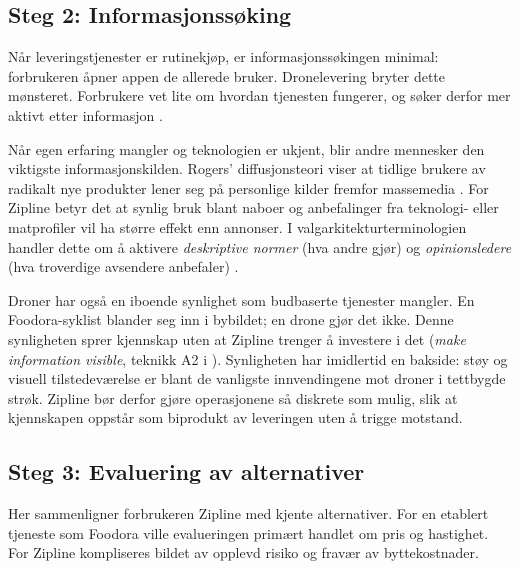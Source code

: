 \documentclass[12pt, a4paper]{article}
\begin{document}
\subsection{Steg 2: Informasjonssøking}

Når leveringstjenester er rutinekjøp, er informasjonssøkingen minimal:
forbrukeren åpner appen de allerede bruker. Dronelevering bryter dette
mønsteret. Forbrukere vet lite om hvordan tjenesten fungerer, og søker
derfor mer aktivt etter informasjon
\parencite[jf.][om søkeinnsats og forhåndskunnskap]{kotlerkeller2016}.

Når egen erfaring mangler og teknologien er ukjent, blir andre mennesker
den viktigste informasjonskilden. Rogers' diffusjonsteori viser at tidlige
brukere av radikalt nye produkter lener seg på personlige kilder fremfor
massemedia \parencite{rogers2003}. For Zipline betyr det at synlig bruk
blant naboer og anbefalinger fra teknologi- eller matprofiler vil ha
større effekt enn annonser. I valgarkitekturterminologien handler dette om
å aktivere \textit{deskriptive normer} (hva andre gjør) og
\textit{opinionsledere} (hva troverdige avsendere anbefaler)
\parencite[jf.][]{muenscher2016}.

Droner har også en iboende synlighet som budbaserte tjenester mangler. En
Foodora-syklist blander seg inn i bybildet; en drone gjør det ikke. Denne
synligheten sprer kjennskap uten at Zipline trenger å investere i det
(\textit{make information visible}, teknikk A2 i \cite{muenscher2016}).
Synligheten har imidlertid en bakside: støy og visuell tilstedeværelse er
blant de vanligste innvendingene mot droner i tettbygde strøk. Zipline bør
derfor gjøre operasjonene så diskrete som mulig, slik at kjennskapen
oppstår som biprodukt av leveringen uten å trigge motstand.

\subsection{Steg 3: Evaluering av alternativer}

Her sammenligner forbrukeren Zipline med kjente alternativer. For en
etablert tjeneste som Foodora ville evalueringen primært handlet om pris og
hastighet. For Zipline kompliseres bildet av opplevd risiko og fravær av
byttekostnader.
\end{document}
